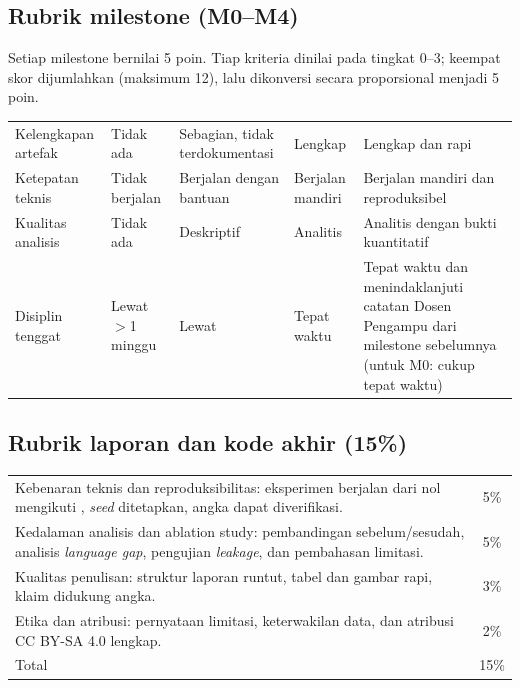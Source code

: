 \documentclass[12pt, a4paper]{article}
\begin{document}
\subsection{Rubrik milestone (M0--M4)}

Setiap milestone bernilai 5 poin. Tiap kriteria dinilai pada tingkat 0--3; keempat skor dijumlahkan (maksimum 12), lalu dikonversi secara proporsional menjadi 5 poin.

\renewcommand{\arraystretch}{1.35}
\begin{center}\small
\begin{tabular}{|L{2.8cm}|L{2.1cm}|L{2.4cm}|L{2.2cm}|L{3.8cm}|}
  \hline
   &  &  &  &  \\
  \hline
  Kelengkapan artefak & Tidak ada & Sebagian, tidak terdokumentasi & Lengkap & Lengkap dan rapi \\
  \hline
  Ketepatan teknis & Tidak berjalan & Berjalan dengan bantuan & Berjalan mandiri & Berjalan mandiri dan reproduksibel \\
  \hline
  Kualitas analisis & Tidak ada & Deskriptif & Analitis & Analitis dengan bukti kuantitatif \\
  \hline
  Disiplin tenggat & Lewat $>$1 minggu & Lewat & Tepat waktu & Tepat waktu dan menindaklanjuti catatan Dosen Pengampu dari milestone sebelumnya (untuk M0: cukup tepat waktu) \\
  \hline
\end{tabular}
\end{center}

\subsection{Rubrik laporan dan kode akhir (15\%)}

\renewcommand{\arraystretch}{1.35}
\begin{center}\small
\begin{tabular}{|L{9.4cm}|c|}
  \hline
   &  \\
  \hline
  Kebenaran teknis dan reproduksibilitas: eksperimen berjalan dari nol mengikuti , \emph{seed} ditetapkan, angka dapat diverifikasi. & 5\% \\
  \hline
  Kedalaman analisis dan ablation study: pembandingan sebelum/sesudah, analisis \emph{language gap}, pengujian \emph{leakage}, dan pembahasan limitasi. & 5\% \\
  \hline
  Kualitas penulisan: struktur laporan runtut, tabel dan gambar rapi, klaim didukung angka. & 3\% \\
  \hline
  Etika dan atribusi: pernyataan limitasi, keterwakilan data, dan atribusi CC BY-SA 4.0 lengkap. & 2\% \\
  \hline
  Total & 15\% \\
  \hline
\end{tabular}
\end{center}
\end{document}
